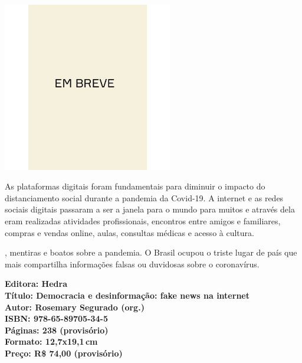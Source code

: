 \begin{center}
\hspace*{-3.6cm}
\hspace*{3.1cm}\includegraphics[width=74mm]{./CAPAS/BREVE.jpg}
\end{center}
\hspace*{-7cm}\hrulefill\hspace*{-7cm}
\medskip

\noindent{}As plataformas digitais foram fundamentais para diminuir o impacto do distanciamento social durante a pandemia da Covid-19. A internet e as redes sociais digitais passaram a ser a janela para o mundo para muitos e através dela eram realizadas atividades profissionais, encontros entre amigos e familiares, compras e vendas online, aulas, consultas médicas e acesso à cultura. 

, mentiras e boatos sobre a pandemia. O Brasil ocupou o triste lugar de país que mais compartilha informações falsas ou duvidosas sobre o coronavírus.

\vfill
\noindent\begin{minipage}[c]{1\linewidth}
{\small\textbf{
\hspace*{-.1cm}Editora: Hedra\\
Título: Democracia e desinformação: fake news na internet\\
Autor: Rosemary Segurado (org.)\\ 
ISBN: 978-65-89705-34-5\\
Páginas: 238 (provisório)\\
Formato: 12,7x19,1\,cm\\
Preço: R\$ 74,00 (provisório)\\
}}
\end{minipage}
\pagebreak

